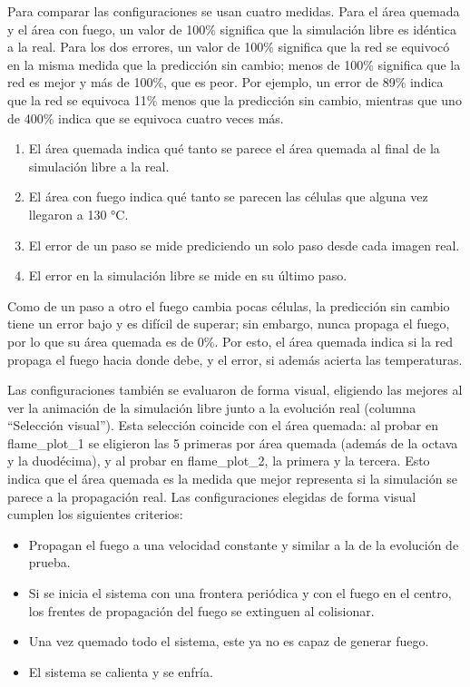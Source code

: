 	Para comparar las configuraciones se usan cuatro medidas. Para el área quemada y el área con fuego, un valor de 100\% significa que la simulación libre es idéntica a la real. Para los dos errores, un valor de 100\% significa que la red se equivocó en la misma medida que la predicción sin cambio; menos de 100\% significa que la red es mejor y más de 100\%, que es peor. Por ejemplo, un error de 89\% indica que la red se equivoca 11\% menos que la predicción sin cambio, mientras que uno de 400\% indica que se equivoca cuatro veces más. 
	
	\begin{enumerate}
		\item El área quemada indica qué tanto se parece el área quemada al final de la simulación libre a la real.
		\item El área con fuego indica qué tanto se parecen las células que alguna vez llegaron a 130 °C.
		\item El error de un paso se mide prediciendo un solo paso desde cada imagen real.
		\item El error en la simulación libre se mide en su último paso.
	\end{enumerate} 

	Como de un paso a otro el fuego cambia pocas células, la predicción sin cambio tiene un error bajo y es difícil de superar; sin embargo, nunca propaga el fuego, por lo que su área quemada es de 0\%. Por esto, el área quemada indica si la red propaga el fuego hacia donde debe, y el error, si además acierta las temperaturas.

	Las configuraciones también se evaluaron de forma visual, eligiendo las mejores al ver la animación de la simulación libre junto a la evolución real (columna ``Selección visual''). Esta selección coincide con el área quemada: al probar en flame\_plot\_1 se eligieron las 5 primeras por área quemada (además de la octava y la duodécima), y al probar en flame\_plot\_2, la primera y la tercera. Esto indica que el área quemada es la medida que mejor representa si la simulación se parece a la propagación real. Las configuraciones elegidas de forma visual cumplen los siguientes criterios:
	
	\begin{itemize}
		\item Propagan el fuego a una velocidad constante y similar a la de la evolución de prueba.
		\item Si se inicia el sistema con una frontera periódica y con el fuego en el centro, los frentes de propagación del fuego se extinguen al colisionar.
		\item Una vez quemado todo el sistema, este ya no es capaz de generar fuego.
		\item El sistema se calienta y se enfría.
	\end{itemize}


